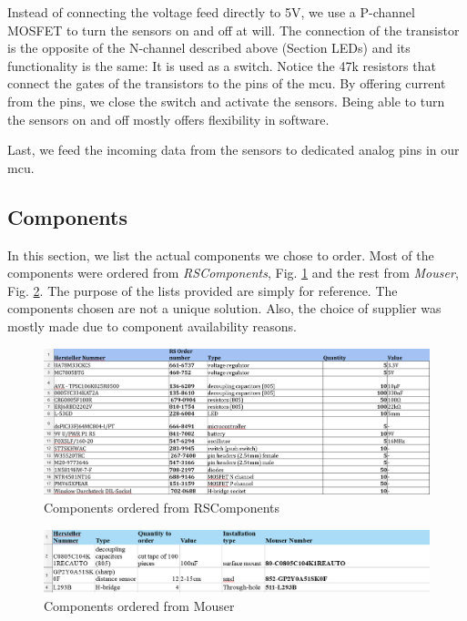 \FloatBarrier

\noindent
Instead of connecting the voltage feed directly to 5V, we use a P-channel MOSFET to turn the sensors on and off at will. The connection of the transistor is the opposite of the N-channel described above (Section LEDs) and its functionality is the same: It is used as a switch. Notice the 47k resistors that connect the gates of the transistors to the pins of the mcu. By offering current from the pins, we close the switch and activate the sensors. Being able to turn the sensors on and off mostly offers flexibility in software.

Last, we feed the incoming data from the sensors to dedicated analog pins in our mcu.

\vspace{1cm}


\subsection{Components}

In this section, we list the actual components we chose to order. Most of the components were ordered from \textit{RSComponents}, Fig. \ref{fig:compRS} and the rest from \textit{Mouser}, Fig. \ref{fig:compMou}. The purpose of the lists provided are simply for reference. The components chosen are not a unique solution. Also, the choice of supplier was mostly made due to component availability reasons.

\begin{figure}[htb]
    \centering
    \includegraphics[width=1\textwidth]{figures/hardware/Components1.PNG}
    \caption{Components ordered from RSComponents}
    \label{fig:compRS}
\end{figure}


\begin{figure}[htb]
    \centering
    \includegraphics[width=1\textwidth]{figures/hardware/Components2.PNG}
    \caption{Components ordered from Mouser}
    \label{fig:compMou}
\end{figure}


